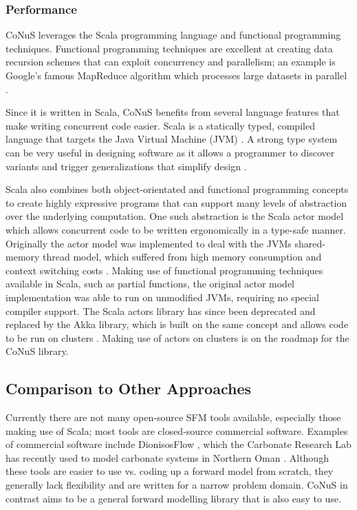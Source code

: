 \documentclass[12pt]{article}
\begin{document}
\subsubsection{Performance}
CoNuS leverages the Scala programming language and functional programming techniques. Functional programming techniques are excellent at creating data recursion schemes that can exploit concurrency and parallelism; an example is Google's famous MapReduce algorithm which processes large datasets in parallel \cite{LAMMEL20081}. 

Since it is written in Scala, CoNuS benefits from several language features that make writing concurrent code easier. Scala is a statically typed, compiled language that targets the Java Virtual Machine (JVM) \cite{scala}. A strong type system can be very useful in designing software as it allows a programmer to discover variants and trigger generalizations that simplify design \cite{LAMMEL20081}. 

Scala also combines both object-orientated and functional programming concepts to create highly expressive programs that can support many levels of abstraction over the underlying computation. One such abstraction is the Scala actor model which allows concurrent code to be written ergonomically in a type-safe manner. Originally the actor model was implemented to deal with the JVMs shared-memory thread model, which suffered from high memory consumption and context switching costs \cite{haller_odersky_2009}. Making use of functional programming techniques available in Scala, such as partial functions, the original actor model implementation was able to run on unmodified JVMs, requiring no special compiler support. The Scala actors library has since been deprecated and replaced by the Akka library, which is built on the same concept and allows code to be run on clusters \cite{akka}. Making use of actors on clusters is on the roadmap for the CoNuS library.


\subsection{Comparison to Other Approaches}
Currently there are not many open-source SFM tools available, especially those making use of Scala; most tools are closed-source commercial software. Examples of commercial software include DionisosFlow \cite{dionisosflow} , which the Carbonate Research Lab has recently used to  model carbonate systems in Northern Oman \cite{ALSALMI201945}. Although these tools are easier to use vs. coding up a forward model from scratch, they generally lack flexibility and are written for a narrow problem domain. CoNuS in contrast aims to be a general forward modelling library that is also easy to use.
\end{document}
